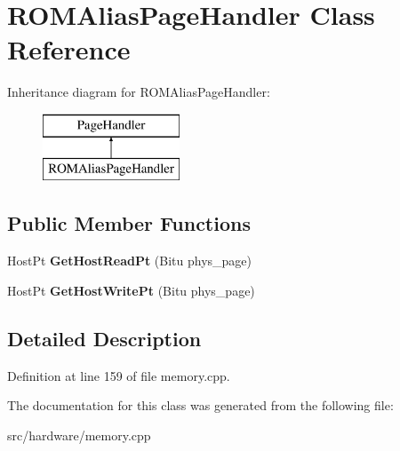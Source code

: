 \hypertarget{classROMAliasPageHandler}{\section{R\-O\-M\-Alias\-Page\-Handler Class Reference}
\label{classROMAliasPageHandler}
}
Inheritance diagram for R\-O\-M\-Alias\-Page\-Handler\-:\begin{figure}[H]
\begin{center}
\leavevmode
\includegraphics[height=2.000000cm]{classROMAliasPageHandler}
\end{center}
\end{figure}
\subsection*{Public Member Functions}
\begin{DoxyCompactItemize}
\item 
\hypertarget{classROMAliasPageHandler_ac9bc56f51008279f62a74204500ec4b3}{Host\-Pt {\bfseries Get\-Host\-Read\-Pt} (Bitu phys\-\_\-page)}\label{classROMAliasPageHandler_ac9bc56f51008279f62a74204500ec4b3}

\item 
\hypertarget{classROMAliasPageHandler_a305a02dd4698bb465b46e96268f2b375}{Host\-Pt {\bfseries Get\-Host\-Write\-Pt} (Bitu phys\-\_\-page)}\label{classROMAliasPageHandler_a305a02dd4698bb465b46e96268f2b375}

\end{DoxyCompactItemize}


\subsection{Detailed Description}


Definition at line 159 of file memory.\-cpp.



The documentation for this class was generated from the following file\-:\begin{DoxyCompactItemize}
\item 
src/hardware/memory.\-cpp\end{DoxyCompactItemize}
